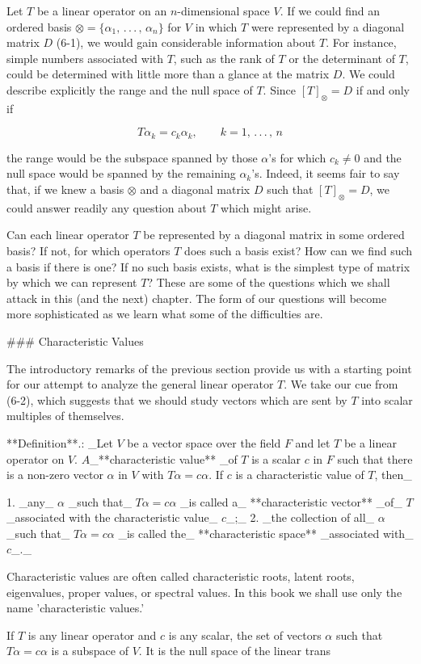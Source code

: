 Let \(T\) be a linear operator on an \(n\)-dimensional space \(V\). If we could find an ordered basis \(\otimes=\{\alpha_{1},\,.\,.\,.\,,\,\alpha_{n}\}\) for \(V\) in which \(T\) were represented by a diagonal matrix \(D\) (6-1), we would gain considerable information about \(T\). For instance, simple numbers associated with \(T\), such as the rank of \(T\) or the determinant of \(T\), could be determined with little more than a glance at the matrix \(D\). We could describe explicitly the range and the null space of \(T\). Since \([T]_{\otimes}=D\) if and only if

\[T\alpha_{k}=c_{k}\alpha_{k},\qquad k=1,\,.\,.\,.\,,\,n\]

the range would be the subspace spanned by those \(\alpha\)'s for which \(c_{k}\neq 0\) and the null space would be spanned by the remaining \(\alpha_{k}\)'s. Indeed, it seems fair to say that, if we knew a basis \(\otimes\) and a diagonal matrix \(D\) such that \([T]_{\otimes}=D\), we could answer readily any question about \(T\) which might arise.

Can each linear operator \(T\) be represented by a diagonal matrix in some ordered basis? If not, for which operators \(T\) does such a basis exist? How can we find such a basis if there is one? If no such basis exists, what is the simplest type of matrix by which we can represent \(T\)? These are some of the questions which we shall attack in this (and the next) chapter. The form of our questions will become more sophisticated as we learn what some of the difficulties are.

### Characteristic Values

The introductory remarks of the previous section provide us with a starting point for our attempt to analyze the general linear operator \(T\). We take our cue from (6-2), which suggests that we should study vectors which are sent by \(T\) into scalar multiples of themselves.

**Definition**.: _Let \(V\) be a vector space over the field \(F\) and let \(T\) be a linear operator on \(V\). \(A\)_**characteristic value** _of \(T\) is a scalar \(c\) in \(F\) such that there is a non-zero vector \(\alpha\) in \(V\) with \(T\alpha=c\alpha\). If \(c\) is a characteristic value of \(T\), then_

1. _any_ \(\alpha\) _such that_ \(T\alpha=c\alpha\) _is called a_ **characteristic vector** _of_ \(T\) _associated with the characteristic value_ \(c\)_;_
2. _the collection of all_ \(\alpha\) _such that_ \(T\alpha=c\alpha\) _is called the_ **characteristic space** _associated with_ \(c\)_._

Characteristic values are often called characteristic roots, latent roots, eigenvalues, proper values, or spectral values. In this book we shall use only the name 'characteristic values.'

If \(T\) is any linear operator and \(c\) is any scalar, the set of vectors \(\alpha\) such that \(T\alpha=c\alpha\) is a subspace of \(V\). It is the null space of the linear trans 